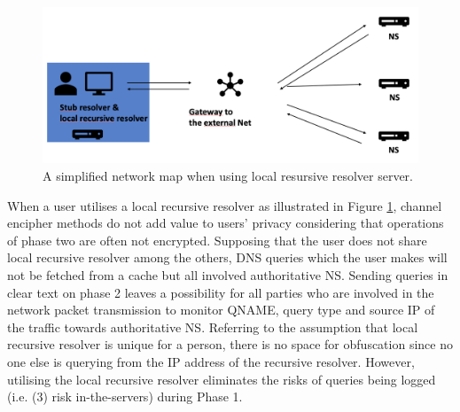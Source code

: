 \documentclass[a4paper,12pt]{article}
\begin{document}
\begin{figure}[ht!]
    \begin{center}
    \includegraphics*[width=0.6\columnwidth]{img/local-recursive}
    \end{center}
    \caption{A simplified network map when using local resursive resolver server.}
    \label{localrecursive}
\end{figure}
When a user utilises a local recursive resolver as illustrated in Figure \ref{localrecursive}, channel encipher methods do not add value to users' privacy considering that operations of phase two are often not encrypted.
Supposing that the user does not share local recursive resolver among the others, DNS queries which the user makes will not be fetched from a cache but all involved authoritative NS.
Sending queries in clear text on phase 2 leaves a possibility for all parties who are involved in the network packet transmission to monitor QNAME, query type and source IP of the traffic towards authoritative NS.
Referring to the assumption that local recursive resolver is unique for a person, there is no space for obfuscation since no one else is querying from the IP address of the recursive resolver.
However, utilising the local recursive resolver eliminates the risks of queries being logged (i.e. (3) risk in-the-servers) during Phase 1.
\end{document}
